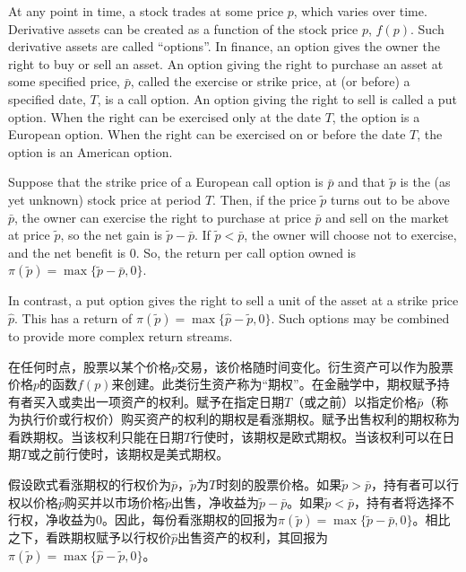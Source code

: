 \begin{original}
At any point in time, a stock trades at some price $p$, which varies over time. Derivative assets can be created as a function of the stock price $p$, $f(p)$. Such derivative assets are called ``options''. In finance, an option gives the owner the right to buy or sell an asset. An option giving the right to purchase an asset at some specified price, $\bar{p}$, called the exercise or strike price, at (or before) a specified date, $T$, is a call option. An option giving the right to sell is called a put option. When the right can be exercised only at the date $T$, the option is a European option. When the right can be exercised on or before the date $T$, the option is an American option.

Suppose that the strike price of a European call option is $\bar{p}$ and that $\tilde{p}$ is the (as yet unknown) stock price at period $T$. Then, if the price $\tilde{p}$ turns out to be above $\bar{p}$, the owner can exercise the right to purchase at price $\bar{p}$ and sell on the market at price $\tilde{p}$, so the net gain is $\tilde{p} - \bar{p}$. If $\tilde{p} < \bar{p}$, the owner will choose not to exercise, and the net benefit is 0. So, the return per call option owned is $\pi(\tilde{p}) = \max\{\tilde{p} - \bar{p}, 0\}$.

In contrast, a put option gives the right to sell a unit of the asset at a strike price $\hat{p}$. This has a return of $\pi(\tilde{p}) = \max\{\hat{p} - \tilde{p}, 0\}$. Such options may be combined to provide more complex return streams.
\end{original}
\begin{translation}
在任何时点，股票以某个价格$p$交易，该价格随时间变化。衍生资产可以作为股票价格$p$的函数$f(p)$来创建。此类衍生资产称为``期权''。在金融学中，期权赋予持有者买入或卖出一项资产的权利。赋予在指定日期$T$（或之前）以指定价格$\bar{p}$（称为执行价或行权价）购买资产的权利的期权是看涨期权。赋予出售权利的期权称为看跌期权。当该权利只能在日期$T$行使时，该期权是欧式期权。当该权利可以在日期$T$或之前行使时，该期权是美式期权。

假设欧式看涨期权的行权价为$\bar{p}$，$\tilde{p}$为$T$时刻的股票价格。如果$\tilde{p} > \bar{p}$，持有者可以行权以价格$\bar{p}$购买并以市场价格$\tilde{p}$出售，净收益为$\tilde{p} - \bar{p}$。如果$\tilde{p} < \bar{p}$，持有者将选择不行权，净收益为0。因此，每份看涨期权的回报为$\pi(\tilde{p}) = \max\{\tilde{p} - \bar{p}, 0\}$。相比之下，看跌期权赋予以行权价$\hat{p}$出售资产的权利，其回报为$\pi(\tilde{p}) = \max\{\hat{p} - \tilde{p}, 0\}$。
\end{translation}

